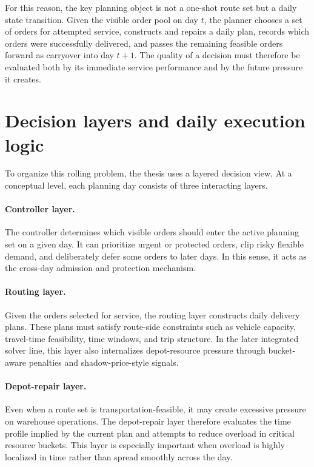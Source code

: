 For this reason, the key planning object is not a one-shot route set but a daily state transition. Given the visible order pool on day $t$, the planner chooses a set of orders for attempted service, constructs and repairs a daily plan, records which orders were successfully delivered, and passes the remaining feasible orders forward as carryover into day $t+1$. The quality of a decision must therefore be evaluated both by its immediate service performance and by the future pressure it creates.

\section{Decision layers and daily execution logic}

To organize this rolling problem, the thesis uses a layered decision view. At a conceptual level, each planning day consists of three interacting layers.

\paragraph{Controller layer.}
The controller determines which visible orders should enter the active planning set on a given day. It can prioritize urgent or protected orders, clip risky flexible demand, and deliberately defer some orders to later days. In this sense, it acts as the cross-day admission and protection mechanism.

\paragraph{Routing layer.}
Given the orders selected for service, the routing layer constructs daily delivery plans. These plans must satisfy route-side constraints such as vehicle capacity, travel-time feasibility, time windows, and trip structure. In the later integrated solver line, this layer also internalizes depot-resource pressure through bucket-aware penalties and shadow-price-style signals.

\paragraph{Depot-repair layer.}
Even when a route set is transportation-feasible, it may create excessive pressure on warehouse operations. The depot-repair layer therefore evaluates the time profile implied by the current plan and attempts to reduce overload in critical resource buckets. This layer is especially important when overload is highly localized in time rather than spread smoothly across the day.


